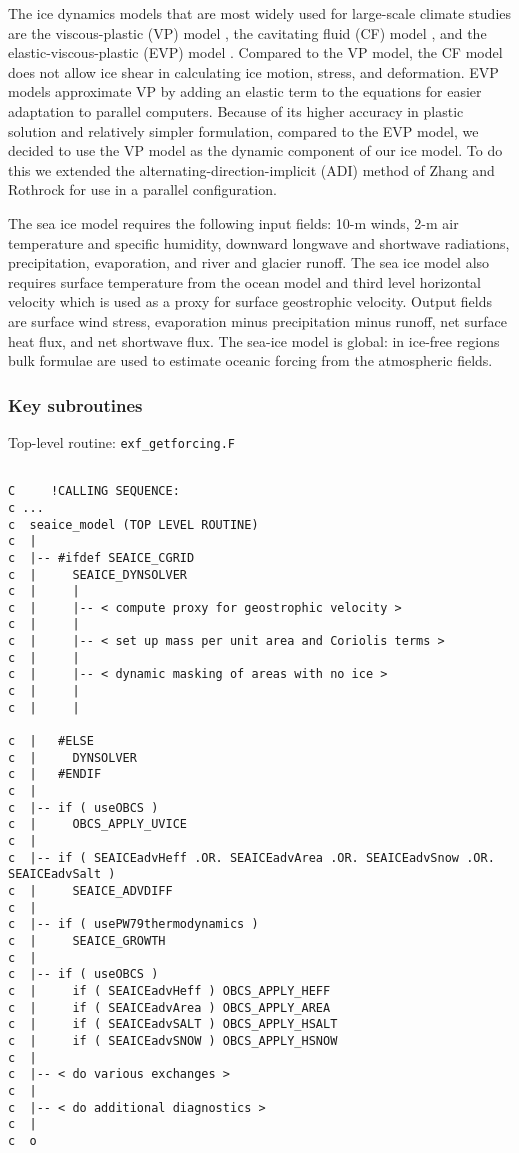 The ice dynamics models that are most widely used for large-scale
climate studies are the viscous-plastic (VP) model \cite{hib79}, the
cavitating fluid (CF) model \cite{fla92}, and the
elastic-viscous-plastic (EVP) model \cite{hun97}.  Compared to the VP
model, the CF model does not allow ice shear in calculating ice
motion, stress, and deformation.  EVP models approximate VP by adding
an elastic term to the equations for easier adaptation to parallel
computers.  Because of its higher accuracy in plastic solution and
relatively simpler formulation, compared to the EVP model, we decided
to use the VP model as the dynamic component of our ice model.  To do
this we extended the alternating-direction-implicit (ADI) method of
Zhang and Rothrock \cite{zha00} for use in a parallel configuration.

The sea ice model requires the following input fields: 10-m winds, 2-m
air temperature and specific humidity, downward longwave and shortwave
radiations, precipitation, evaporation, and river and glacier runoff.
The sea ice model also requires surface temperature from the ocean
model and third level horizontal velocity which is used as a proxy for
surface geostrophic velocity.  Output fields are surface wind stress,
evaporation minus precipitation minus runoff, net surface heat flux,
and net shortwave flux.  The sea-ice model is global: in ice-free
regions bulk formulae are used to estimate oceanic forcing from the
atmospheric fields.



\subsubsection{Key subroutines
\label{sec:pkg:seaice:subroutines}}

Top-level routine: \texttt{exf\_getforcing.F}

{\footnotesize
\begin{verbatim}

C     !CALLING SEQUENCE:
c ...
c  seaice_model (TOP LEVEL ROUTINE)
c  |
c  |-- #ifdef SEAICE_CGRID
c  |     SEAICE_DYNSOLVER
c  |     |
c  |     |-- < compute proxy for geostrophic velocity >
c  |     |
c  |     |-- < set up mass per unit area and Coriolis terms >
c  |     |
c  |     |-- < dynamic masking of areas with no ice >
c  |     |
c  |     |

c  |   #ELSE
c  |     DYNSOLVER
c  |   #ENDIF
c  |
c  |-- if ( useOBCS ) 
c  |     OBCS_APPLY_UVICE
c  |
c  |-- if ( SEAICEadvHeff .OR. SEAICEadvArea .OR. SEAICEadvSnow .OR. SEAICEadvSalt )
c  |     SEAICE_ADVDIFF
c  |
c  |-- if ( usePW79thermodynamics ) 
c  |     SEAICE_GROWTH
c  |
c  |-- if ( useOBCS ) 
c  |     if ( SEAICEadvHeff ) OBCS_APPLY_HEFF
c  |     if ( SEAICEadvArea ) OBCS_APPLY_AREA
c  |     if ( SEAICEadvSALT ) OBCS_APPLY_HSALT
c  |     if ( SEAICEadvSNOW ) OBCS_APPLY_HSNOW
c  |
c  |-- < do various exchanges >
c  |
c  |-- < do additional diagnostics >
c  |
c  o

\end{verbatim}
}


